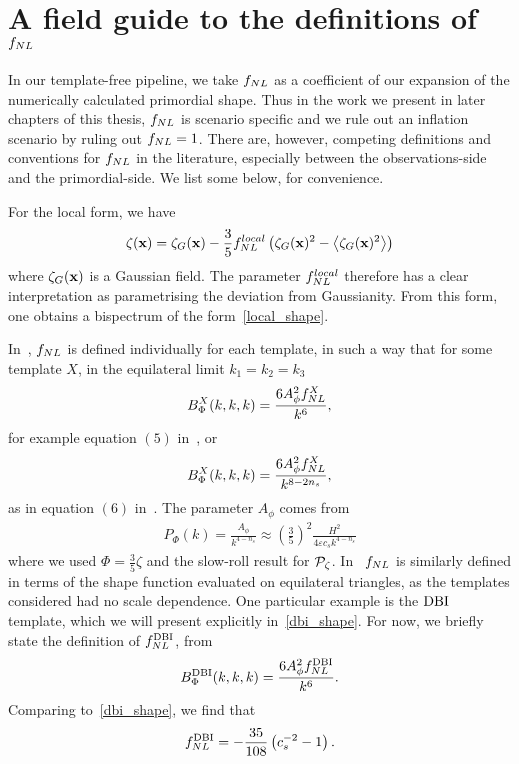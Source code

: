     \section{A field guide to the definitions of $f_{NL}$}
    In our template-free pipeline, we take $f_{NL}$ as a coefficient of our expansion
    of the numerically calculated primordial shape. Thus in the work we present in
    later chapters of this thesis, $f_{NL}$ is scenario specific and we rule out an
    inflation scenario by ruling out $f_{NL}=1$. There are, however, competing
    definitions and conventions for $f_{NL}$ in the literature, especially between
    the observations-side and the primordial-side. We list some below, for convenience.


    For the local form, we have
    \begin{align}\label{fnllocal_quadratic}
        \zeta(\mathbf{x}) = \zeta_G(\mathbf{x}) - \frac{3}{5}f^{local}_{NL}\left(\zeta_G(\mathbf{x})^2-\left<\zeta_G(\mathbf{x})^2\right>\right)
    \end{align}
    where $\zeta_G(\mathbf{x})$ is a Gaussian field. The parameter $f^{local}_{NL}$ therefore has a clear
    interpretation as parametrising the deviation from Gaussianity. From this form,
    one obtains a bispectrum of the form~\eqref{local_shape}.


    In~\cite{Planck_NG_2013}, $f_{NL}$ is defined individually for each template, in such a way
    that for some template $X$, in the equilateral limit $k_1=k_2=k_3$
    \begin{align}\label{planck_fnl_defn}
        B^X_\Phi(k,k,k) = \frac{6A_\phi^2f_{NL}^X}{k^6},
    \end{align}
    for example equation $(5)$ in~\cite{Planck_NG_2013},
    or
    \begin{align}\label{planck_fnl_defn_ns}
        B^X_\Phi(k,k,k) = \frac{6A_\phi^2f_{NL}^X}{k^{8-2n_s}},
    \end{align}
    as in equation $(6)$ in~\cite{Planck_NG_2013}.
    The parameter $A_\phi$ comes from
    \begin{align}
        P_\Phi(k) = \frac{A_\phi}{k^{4-n_s}}\approx\left(\frac{3}{5}\right)^2\frac{H^2}{4\varepsilon c_sk^{4-n_s}}
    \end{align}
    where we used $\Phi=\frac{3}{5}\zeta$ and the slow-roll result for $\mathcal{P}_{\mathcal{\zeta}}$.
    In~\cite{seery_ng_0503, chen_ng_0605, dbi_in_the_sky} $f_{NL}$ is similarly defined in terms
    of the shape function evaluated on equilateral triangles,
    as the templates considered had no scale dependence.
    One particular example is the $\text{DBI}$ template, which we will present explicitly in~\eqref{dbi_shape}.
    For now, we briefly state the definition of $f_{NL}^{\text{DBI}}$, from~\cite{Planck_NG_2013}
    \begin{align}
        B^{\text{DBI}}_\Phi(k,k,k) = \frac{6A_\phi^2f_{NL}^{\text{DBI}}}{k^{6}}.
    \end{align}
    Comparing to~\eqref{dbi_shape}, we find that
    \begin{align}\label{fnl_dbi_defn}
        f_{NL}^{\text{DBI}} = -\frac{35}{108}\left(c_s^{-2}-1\right).
    \end{align}


